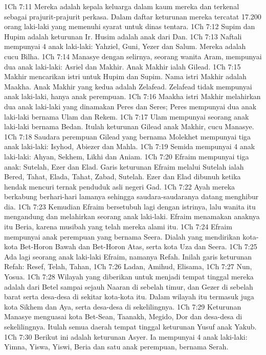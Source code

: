1Ch 7:11  Mereka adalah kepala keluarga dalam kaum mereka dan terkenal sebagai prajurit-prajurit perkasa. Dalam daftar keturunan mereka tercatat 17.200 orang laki-laki yang memenuhi syarat untuk dinas tentara.
1Ch 7:12  Supim dan Hupim adalah keturunan Ir. Husim adalah anak dari Dan.
1Ch 7:13  Naftali mempunyai 4 anak laki-laki: Yahziel, Guni, Yezer dan Salum. Mereka adalah cucu Bilha.
1Ch 7:14  Manasye dengan selirnya, seorang wanita Aram, mempunyai dua anak laki-laki: Asriel dan Makhir. Anak Makhir ialah Gilead.
1Ch 7:15  Makhir mencarikan istri untuk Hupim dan Supim. Nama istri Makhir adalah Maakha. Anak Makhir yang kedua adalah Zelafead. Zelafead tidak mempunyai anak laki-laki, hanya anak perempuan.
1Ch 7:16  Maakha istri Makhir melahirkan dua anak laki-laki yang dinamakan Peres dan Seres; Peres mempunyai dua anak laki-laki bernama Ulam dan Rekem.
1Ch 7:17  Ulam mempunyai seorang anak laki-laki bernama Bedan. Itulah keturunan Gilead anak Makhir, cucu Manasye.
1Ch 7:18  Saudara perempuan Gilead yang bernama Molekhet mempunyai tiga anak laki-laki: Isyhod, Abiezer dan Mahla.
1Ch 7:19  Semida mempunyai 4 anak laki-laki: Ahyan, Sekhem, Likhi dan Aniam.
1Ch 7:20  Efraim mempunyai tiga anak: Sutelah, Ezer dan Elad. Garis keturunan Efraim melalui Sutelah ialah Bered, Tahat, Elada, Tahat, Zabad, Sutelah. Ezer dan Elad dibunuh ketika hendak mencuri ternak penduduk asli negeri Gad.
1Ch 7:22  Ayah mereka berkabung berhari-hari lamanya sehingga saudara-saudaranya datang menghibur dia.
1Ch 7:23  Kemudian Efraim bersetubuh lagi dengan istrinya, lalu wanita itu mengandung dan melahirkan seorang anak laki-laki. Efraim menamakan anaknya itu Beria, karena musibah yang telah mereka alami itu.
1Ch 7:24  Efraim mempunyai anak perempuan yang bernama Seera. Dialah yang mendirikan kota-kota Bet-Horon Bawah dan Bet-Horon Atas, serta kota Uza dan Seera.
1Ch 7:25  Ada lagi seorang anak laki-laki Efraim, namanya Refah. Inilah garis keturunan Refah: Resef, Telah, Tahan,
1Ch 7:26  Ladan, Amihud, Elisama,
1Ch 7:27  Nun, Yosua.
1Ch 7:28  Wilayah yang diberikan untuk menjadi tempat tinggal mereka adalah dari Betel sampai sejauh Naaran di sebelah timur, dan Gezer di sebelah barat serta desa-desa di sekitar kota-kota itu. Dalam wilayah itu termasuk juga kota Sikhem dan Aya, serta desa-desa di sekelilingnya.
1Ch 7:29  Keturunan Manasye menguasai kota Bet-Sean, Taanakh, Megido, Dor dan desa-desa di sekelilingnya. Itulah semua daerah tempat tinggal keturunan Yusuf anak Yakub.
1Ch 7:30  Berikut ini adalah keturunan Asyer. Ia mempunyai 4 anak laki-laki: Yimna, Yiswa, Yiswi, Beria dan satu anak perempuan, bernama Serah.
